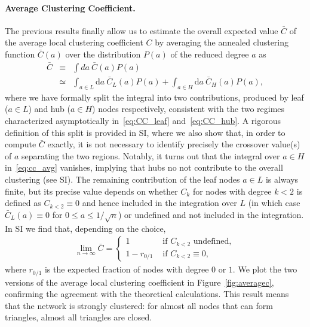 \documentclass[ twocolumn,
 amsmath,amssymb,
 aps, pre, amsthm, amsfonts,
]{revtex4-2}
\begin{document}
\paragraph*{Average Clustering Coefficient.}
The previous results finally allow us to estimate the overall expected value $\bar{C}$ of the average local clustering coefficient $C$ by averaging the annealed clustering function $\bar{C}(a)$ over the distribution $P(a)$ of the reduced degree $a$ as
\begin{eqnarray}
    \bar{C} &\equiv& \int da~ \bar{C}(a) P(a) \nonumber\\
    &\simeq& \int_{a\in L} {\mathrm d}a~ \bar{C}_L(a) P(a) + \int_{a\in H} {\mathrm d}a~ \bar{C}_H(a) P(a),
    \label{eq:cc_avg} 
\end{eqnarray}
where we have formally split the integral into two contributions, produced by leaf ($a\in L$) and hub ($a\in H$) nodes respectively, consistent with the two regimes characterized asymptotically in~\eqref{eq:CC_leaf} and~\eqref{eq:CC_hub}. 
A rigorous definition of this split is provided in SI, where we also show that, in order to compute $\bar{C}$ exactly, it is not necessary to identify precisely the crossover value(s) of $a$ separating the two regions. 
Notably, it turns out that the integral over $a\in H$ in~\eqref{eq:cc_avg} vanishes, implying that hubs no not contribute to the overall clustering (see SI). 
The remaining contribution of the leaf nodes $a\in L$ is always finite, but its precise value depends on whether $C_{k}$ for nodes with degree $k<2$ is defined as $C_{k<2}\equiv0$ and hence included in the integration over $L$ (in which case $\bar{C}_L(a)\equiv 0$ for $0\le a\le 1/\sqrt{n}$) or undefined and not included in the integration. 
In SI we find that, depending on the choice,
\begin{align}
    \lim_{n\to\infty} \bar{C} = \begin{cases}
        1 & \text{ if } C_{k<2} \text{ undefined}, \\
        1 - r_{0/1} & \text{ if } C_{k<2} \equiv 0,
    \end{cases} \label{eq:cc_final} 
\end{align}
where $r_{0/1}$ is the expected fraction of nodes with degree $0$ or $1$. We plot the two versions of the average local clustering coefficient in Figure~\ref{fig:averagec}, confirming the agreement with the theoretical calculations. This result means that the network is strongly clustered: for almost all nodes that can form triangles, almost all triangles are closed. 
\end{document}
